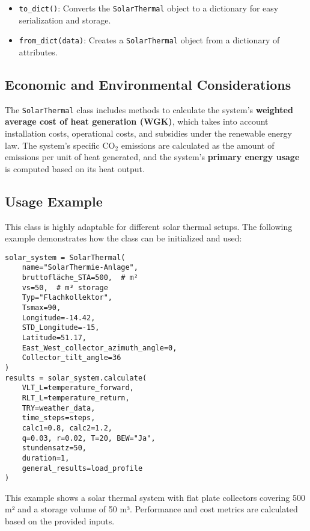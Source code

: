 \begin{itemize}
    \item \texttt{to\_dict()}: Converts the \texttt{SolarThermal} object to a dictionary for easy serialization and storage.
    
    \item \texttt{from\_dict(data)}: Creates a \texttt{SolarThermal} object from a dictionary of attributes.
\end{itemize}

\subsection{Economic and Environmental Considerations}
The \texttt{SolarThermal} class includes methods to calculate the system's \textbf{weighted average cost of heat generation (WGK)}, which takes into account installation costs, operational costs, and subsidies under the renewable energy law. The system's specific CO$_2$ emissions are calculated as the amount of emissions per unit of heat generated, and the system's \textbf{primary energy usage} is computed based on its heat output.

\subsection{Usage Example}
This class is highly adaptable for different solar thermal setups. The following example demonstrates how the class can be initialized and used:

\begin{verbatim}
solar_system = SolarThermal(
    name="SolarThermie-Anlage",
    bruttofläche_STA=500,  # m²
    vs=50,  # m³ storage
    Typ="Flachkollektor",
    Tsmax=90, 
    Longitude=-14.42, 
    STD_Longitude=-15, 
    Latitude=51.17, 
    East_West_collector_azimuth_angle=0, 
    Collector_tilt_angle=36
)
results = solar_system.calculate(
    VLT_L=temperature_forward, 
    RLT_L=temperature_return, 
    TRY=weather_data, 
    time_steps=steps, 
    calc1=0.8, calc2=1.2, 
    q=0.03, r=0.02, T=20, BEW="Ja", 
    stundensatz=50, 
    duration=1, 
    general_results=load_profile
)
\end{verbatim}
This example shows a solar thermal system with flat plate collectors covering 500 m² and a storage volume of 50 m³. Performance and cost metrics are calculated based on the provided inputs.
